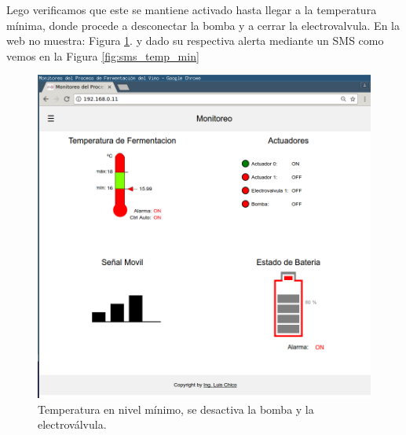 Lego verificamos que este se mantiene activado hasta llegar a la temperatura mínima, donde procede a desconectar la bomba y a cerrar la electrovalvula. En la web no muestra: Figura \ref{fig:auto_control_inactive}. y dado su respectiva alerta mediante un SMS como vemos en la Figura \ref{fig:sms_temp_min}

\begin{figure}[h]
  \centering
  \includegraphics[scale=.25]{./Figures/auto_control_inactive.png}
  \caption{Temperatura en nivel mínimo, se desactiva la bomba y la electroválvula.}
  \label{fig:auto_control_inactive}
\end{figure}


